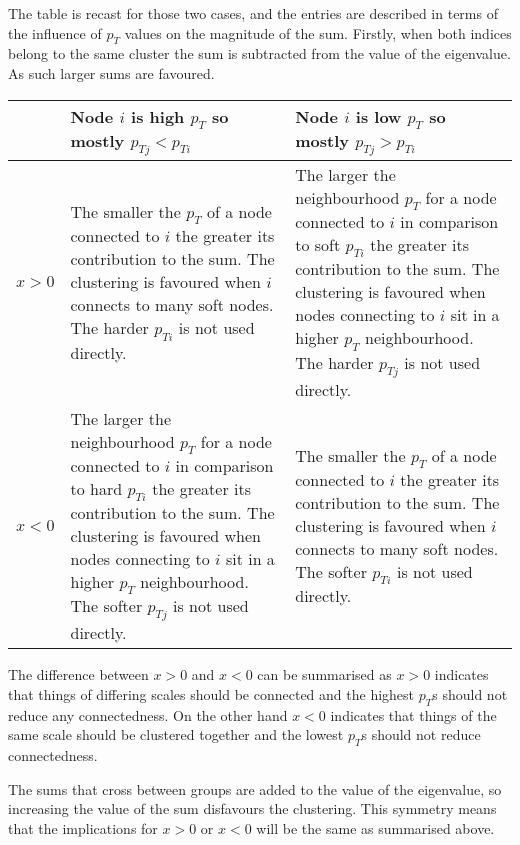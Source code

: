 The table is recast for those two cases, and the entries are described in terms of the influence of \(p_T\)
values on the magnitude of the sum.
Firstly, when both indices belong to the same cluster the sum is subtracted from the value of the eigenvalue. As such larger sums are favoured.
\begin{center}
    \begin{tabular}{c | p{} p{}}
                & Node \(i\) is high \(p_T\) so mostly \(p_{Tj} < p_{Ti}\) & Node \(i\) is low \(p_T\) so mostly \(p_{Tj} > p_{Ti}\) \\
        \hline
        \(x>0\) & The smaller the \(p_T\) of a node connected to \(i\) the greater its contribution to the sum. The clustering is favoured when \(i\) connects to many soft nodes. The harder \(p_{Ti}\) is not used directly.&
        The larger the neighbourhood \(p_T\) for a node connected to \(i\) in comparison to soft \(p_{Ti}\) the greater its contribution to the sum. The clustering is favoured when nodes connecting to \(i\) sit in a higher \(p_T\) neighbourhood. The harder \(p_{Tj}\) is not used directly.\\
        \(x < 0\) &  The larger the neighbourhood \(p_T\) for a node connected to \(i\) in comparison to hard \(p_{Ti}\) the greater its contribution to the sum. The clustering is favoured when nodes connecting to \(i\) sit in a higher \(p_T\) neighbourhood. The softer \(p_{Tj}\) is not used directly. &
        The smaller the \(p_T\) of a node connected to \(i\) the greater its contribution to the sum. The clustering is favoured when \(i\) connects to many soft nodes. The softer \(p_{Ti}\) is not used directly.\\
    \end{tabular}
\end{center}

The difference between \(x > 0\) and \(x < 0\) can be summarised as \(x > 0\) indicates that things
of differing scales should be connected and the highest \(p_T\)s should not reduce any connectedness.
On the other hand \(x < 0\) indicates that things of the same scale should be clustered together and the lowest \(p_T\)s should not reduce connectedness.


The sums that cross between groups are added to the value of the eigenvalue,
so increasing the value of the sum disfavours the clustering.
This symmetry means that the implications for \(x > 0\) or \(x < 0\) will be the same as summarised above.

